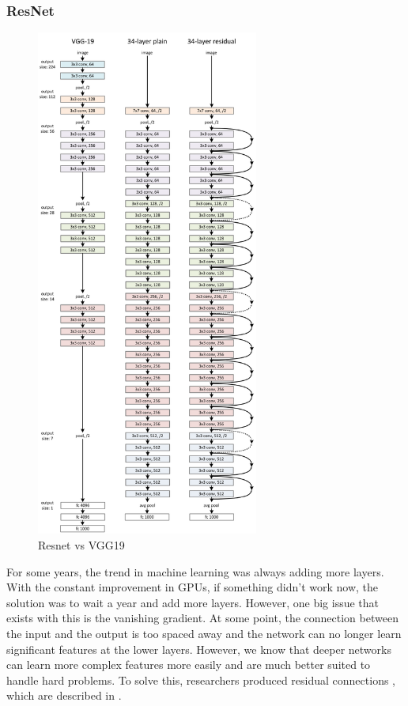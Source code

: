 \subsubsection{ResNet}\label{s:imagenet-resnet}
\begin{figure}[H]
	\centering
	\includegraphics[width=0.65\textwidth]{images/resnetvsvgg}
	\caption{Resnet vs VGG19}
	\label{f:imagenet-resnet}
\end{figure}

For some years, the trend in machine learning was always adding more layers. With the constant improvement in GPUs, if something didn't work now, the solution was to wait a year and add more layers. However, one big issue that exists with this is the vanishing gradient. At some point, the connection between the input and the output is too spaced away and the network can no longer learn significant features at the lower layers. However, we know that deeper networks can learn more complex features more easily and are much better suited to handle hard problems. To solve this, researchers produced residual connections \cite{he2016deep}, which are described in .

